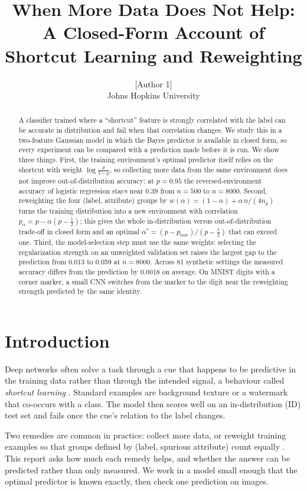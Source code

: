 \documentclass{article}
\title{When More Data Does Not Help:\\ A Closed-Form Account of Shortcut Learning and Reweighting}
\author{%
  [Author 1] \And [Author 2] \And [Author 3]\\
  Johns Hopkins University
}
\begin{document}
\maketitle

\begin{abstract}
A classifier trained where a ``shortcut'' feature is strongly correlated with the label can be
accurate in distribution and fail when that correlation changes. We study this in a two-feature
Gaussian model in which the Bayes predictor is available in closed form, so every experiment can
be compared with a prediction made before it is run. We show three things. First, the training
environment's optimal predictor itself relies on the shortcut with weight $\log\frac{p}{1-p}$,
so collecting more data from the same environment does not improve out-of-distribution accuracy:
at $p=0.95$ the reversed-environment accuracy of logistic regression stays near $0.39$ from
$n=500$ to $n=8000$. Second, reweighting the four (label, attribute) groups by
$w(\alpha)=(1-\alpha)+\alpha\,n/(4n_g)$ turns the training distribution into a new environment
with correlation $p_\alpha=p-\alpha(p-\tfrac12)$; this gives the whole in-distribution versus
out-of-distribution trade-off in closed form and an optimal $\alpha^*=(p-p_{\text{test}})/(p-\tfrac12)$
that can exceed one. Third, the model-selection step must use the same weights: selecting the
regularization strength on an unweighted validation set raises the largest gap to the prediction
from 0.013 to 0.059 at $n=8000$. Across 81 synthetic settings the measured accuracy differs from the prediction by
0.0018 on average. On MNIST digits with a corner marker, a small CNN switches from the marker to
the digit near the reweighting strength predicted by the same identity.
\end{abstract}

\section{Introduction}
\label{sec:intro}

Deep networks often solve a task through a cue that happens to be predictive in the training data
rather than through the intended signal, a behaviour called \emph{shortcut learning}
\cite{geirhos2020shortcut}. Standard examples are background texture or a watermark that
co-occurs with a class. The model then scores well on an in-distribution (ID) test set and fails
once the cue's relation to the label changes.

Two remedies are common in practice: collect more data, or reweight training examples so that
groups defined by (label, spurious attribute) count equally \cite{sagawa2020dro,idrissi2022balancing}.
This report asks how much each remedy helps, and whether the answer can be predicted rather than
only measured. We work in a model small enough that the optimal predictor is known exactly, then
check one prediction on images.
\end{document}
